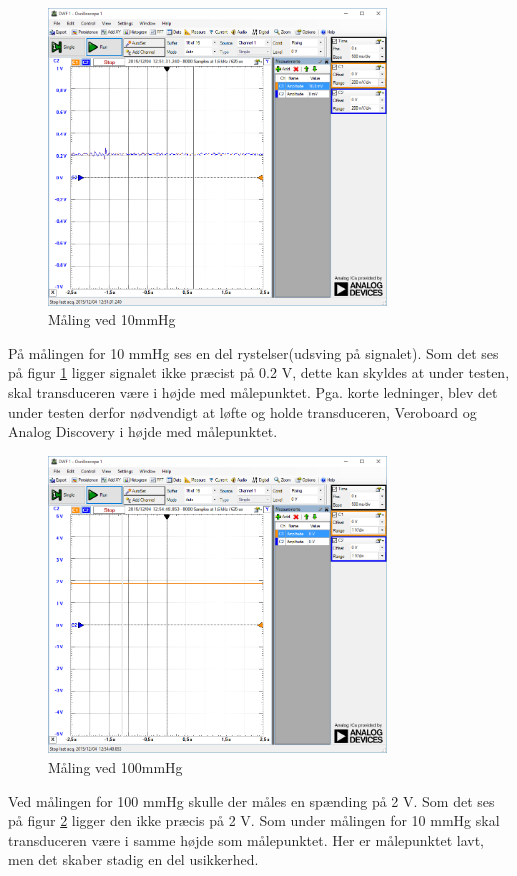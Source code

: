 \begin{figure}[H]
	\centering	\includegraphics[width=0.8\textwidth]{Figurer/10mmhg}
	\caption{Måling ved 10mmHg}
	\label{fig:vandtest_måling10}
\end{figure}
På målingen for 10 mmHg ses en del rystelser(udsving på signalet). Som det ses på figur \ref{fig:vandtest_måling10} ligger signalet ikke præcist på 0.2 V, dette kan skyldes at under testen, skal transduceren være i højde med målepunktet. Pga. korte ledninger, blev det under testen derfor nødvendigt at løfte og holde transduceren, Veroboard og Analog Discovery i højde med målepunktet. 

\begin{figure}[H]
	\centering	\includegraphics[width=0.8\textwidth]{Figurer/100mmhg}
	\caption{Måling ved 100mmHg}
	\label{fig:vandtest_måling100}
\end{figure}
Ved målingen for 100 mmHg skulle der måles en spænding på 2 V. Som det ses på figur \ref{fig:vandtest_måling100} ligger den ikke præcis på 2 V. Som under målingen for 10 mmHg skal transduceren være i samme højde som målepunktet. Her er målepunktet lavt, men det skaber stadig en del usikkerhed.

